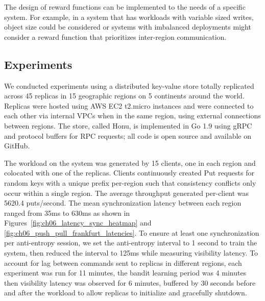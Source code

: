 The design of reward functions can be implemented to the needs of a specific
system.
For example, in a system that has workloads with variable sized writes, object
size could be considered or systems with imbalanced deployments might
consider a reward function that prioritizes inter-region communication.

\subsection{Experiments}

We conducted experiments using a distributed key-value store totally
replicated across 45 replicas in 15 geographic regions on 5 continents
around the world.
Replicas were hosted using AWS EC2 t2.micro instances and were connected to
each other via internal VPCs when in the same region, using external
connections between regions.
The store, called Honu, is implemented in Go 1.9 using gRPC and protocol
buffers for RPC requests; all code is open source and available on GitHub.

The workload on the system was generated by 15 clients, one in each region and
colocated with one of the replicas.
Clients continuously created Put requests for random keys with a unique
prefix per-region such that consistency conflicts only occur within a
single region.
The average throughput generated per-client was 5620.4 puts/second.
The mean synchronization latency between each region ranged from 35ms to
630ms as shown in Figures~\ref{fig:ch06_latency_sync_heatmap} and \ref{fig:ch06_push_pull_frankfurt_latencies}.
To ensure at least one synchronization per anti-entropy session, we set the
anti-entropy interval to 1 second to train the system, then reduced the
interval to 125ms while measuring visibility latency.
To account for lag between commands sent to replicas in different regions,
each experiment was run for 11 minutes, the bandit learning period was 4
minutes then visibility latency was observed for 6 minutes, buffered by 30
seconds before and after the workload to allow replicas to initialize and
gracefully shutdown.

